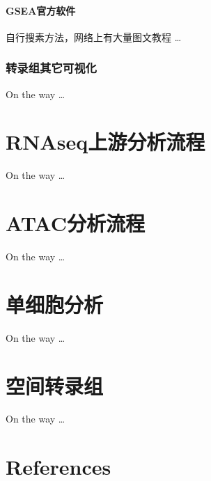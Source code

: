\documentclass[
]{book}
\begin{document}
\subsubsection{GSEA官方软件}\label{gseaux5b98ux65b9ux8f6fux4ef6}

自行搜素方法，网络上有大量图文教程 \ldots{}

\subsection{转录组其它可视化}\label{visual}

On the way \ldots{}

\chapter{RNAseq上游分析流程}\label{rnaseq-rsubread}

On the way \ldots{}

\chapter{ATAC分析流程}\label{cuttag}

On the way \ldots{}

\chapter{单细胞分析}\label{scRNA}

On the way \ldots{}

\chapter{空间转录组}\label{spatial}

On the way \ldots{}

\chapter*{References}\label{references}

  
\end{document}
